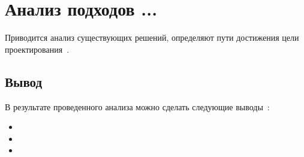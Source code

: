\section{Анализ подходов ...}
\label{sec:analysis}

Приводится анализ существующих решений, определяют пути достижения цели проектирования~\cite{Monografiya2023}.

\subsection{Вывод}
В результате проведенного анализа можно сделать следующие выводы~\cite{Golenkov2023, Shunkevich2016}:

\begin{itemize}
    \item
    \item
    \item
\end{itemize}